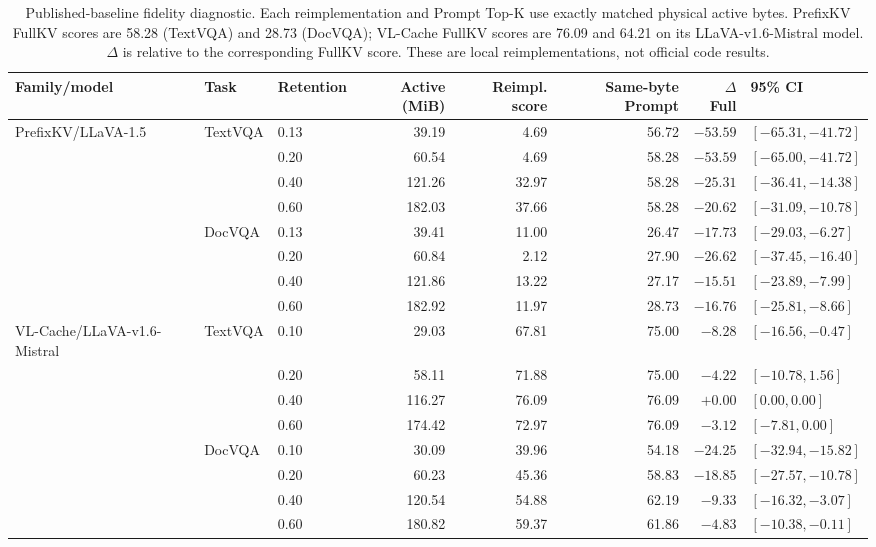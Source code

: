 \begin{table}[t]
\centering
\caption{Published-baseline fidelity diagnostic.  Each reimplementation and
Prompt Top-K use exactly matched physical active bytes.  PrefixKV FullKV
scores are 58.28 (TextVQA) and 28.73 (DocVQA); VL-Cache FullKV scores are
76.09 and 64.21 on its LLaVA-v1.6-Mistral model.  $\Delta$ is relative to the
corresponding FullKV score.  These are local reimplementations, not official
code results.}
\label{tab:published-baseline-fidelity}
\scriptsize
\setlength{\tabcolsep}{3.2pt}
\begin{tabular}{lllrrrrl}
\toprule
Family/model & Task & Retention & Active (MiB) & Reimpl. score & Same-byte Prompt & $\Delta$ Full & 95\% CI \\
\midrule
PrefixKV/LLaVA-1.5 & TextVQA & 0.13 & 39.19 & 4.69 & 56.72 & $-53.59$ & $[-65.31,-41.72]$ \\
 & & 0.20 & 60.54 & 4.69 & 58.28 & $-53.59$ & $[-65.00,-41.72]$ \\
 & & 0.40 & 121.26 & 32.97 & 58.28 & $-25.31$ & $[-36.41,-14.38]$ \\
 & & 0.60 & 182.03 & 37.66 & 58.28 & $-20.62$ & $[-31.09,-10.78]$ \\
\cmidrule(lr){2-8}
 & DocVQA & 0.13 & 39.41 & 11.00 & 26.47 & $-17.73$ & $[-29.03,-6.27]$ \\
 & & 0.20 & 60.84 & 2.12 & 27.90 & $-26.62$ & $[-37.45,-16.40]$ \\
 & & 0.40 & 121.86 & 13.22 & 27.17 & $-15.51$ & $[-23.89,-7.99]$ \\
 & & 0.60 & 182.92 & 11.97 & 28.73 & $-16.76$ & $[-25.81,-8.66]$ \\
\midrule
VL-Cache/LLaVA-v1.6-Mistral & TextVQA & 0.10 & 29.03 & 67.81 & 75.00 & $-8.28$ & $[-16.56,-0.47]$ \\
 & & 0.20 & 58.11 & 71.88 & 75.00 & $-4.22$ & $[-10.78,1.56]$ \\
 & & 0.40 & 116.27 & 76.09 & 76.09 & $+0.00$ & $[0.00,0.00]$ \\
 & & 0.60 & 174.42 & 72.97 & 76.09 & $-3.12$ & $[-7.81,0.00]$ \\
\cmidrule(lr){2-8}
 & DocVQA & 0.10 & 30.09 & 39.96 & 54.18 & $-24.25$ & $[-32.94,-15.82]$ \\
 & & 0.20 & 60.23 & 45.36 & 58.83 & $-18.85$ & $[-27.57,-10.78]$ \\
 & & 0.40 & 120.54 & 54.88 & 62.19 & $-9.33$ & $[-16.32,-3.07]$ \\
 & & 0.60 & 180.82 & 59.37 & 61.86 & $-4.83$ & $[-10.38,-0.11]$ \\
\bottomrule
\end{tabular}
\end{table}
